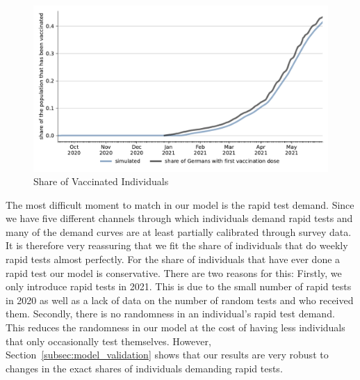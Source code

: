 \begin{figure}[ht]   %
  \centering
  \includegraphics[width=\textwidth]{figures/results/figures/scenario_comparisons/combined_fit/full_ever_vaccinated}
  \caption{Share of Vaccinated Individuals}
  \label{fig:fit_vaccinations}
\end{figure}

The most difficult moment to match in our model is the rapid test demand. Since we have
five different channels through which individuals demand rapid tests and many of the
demand curves are at least partially calibrated through survey data. It is therefore very
reassuring that we fit the share of individuals that do weekly rapid tests almost
perfectly. For the share of individuals that have ever done a rapid test our model is
conservative. There are two reasons for this: Firstly, we only introduce rapid tests in
2021. This is due to the small number of rapid tests in 2020 as well as a lack of data on
the number of random tests and who received them. Secondly, there is no randomness in an
individual's rapid test demand. This reduces the randomness in our model at the cost of
having less individuals that only occasionally test themselves.  However,
Section~\ref{subsec:model_validation} shows that our results are very robust to changes
in the exact shares of individuals demanding rapid tests.


